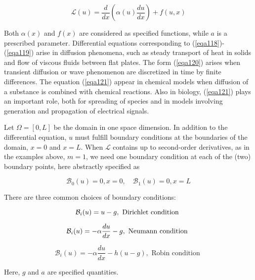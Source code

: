 \documentclass[../main.tex]{subfiles}
\begin{document}
	\begin{equation}
		\label{eqa121}
		\mathcal{L}(u)=\frac{d}{d x}\left(\alpha(u) \frac{d u}{d x}\right)+f(u, x)
	\end{equation}
	
	\noindent Both $\alpha(x)$ and $f(x)$ are considered as specified functions, while $a$ is a prescribed parameter. Differential equations corresponding to (\ref{eqa118})-(\ref{eqa119}) arise in diffusion phenomena, such as steady transport of heat in solids and flow of viscous fluids between flat plates. The form (\ref{eqa120}) arises when transient diffusion or wave phenomenon are discretized in time by finite differences. The equation (\ref{eqa121}) appear in chemical models when diffusion of a substance is combined with chemical reactions. Also in biology, (\ref{eqa121}) plays an important role, both for spreading of species and in models involving generation and propagation of electrical signals.
	
	Let $\Omega=[0, L]$ be the domain in one space dimension. In addition to the differential equation, $u$ must fulfill boundary conditions at the boundaries of the domain, $x=0$ and $x=L$. When $\mathcal{L}$ contains up to second-order derivatives, as in the examples above, $m=1$, we need one boundary condition at each of the (two) boundary points, here abstractly specified as
	
	\begin{equation}
		\label{eqa122}
		\mathcal{B}_{0}(u)=0, x=0, \quad \mathcal{B}_{1}(u)=0, x=L
	\end{equation}
	
	\noindent There are three common choices of boundary conditions:
	
	\begin{equation}
		\label{eqa123}
		\mathcal{B}_{i}(u)  =u-g,  \text { Dirichlet condition } \\
	\end{equation}

	\begin{equation}
		\label{eqa124}
		\mathcal{B}_{i}(u)  =-\alpha \frac{d u}{d x}-g,  \text { Neumann condition } \\
	\end{equation}

	\begin{equation}
		\label{eqa125}
		\mathcal{B}_{i}(u) =-\alpha \frac{d u}{d x}-h(u-g),  \text { Robin condition }
	\end{equation}	

	\noindent Here, $g$ and $a$ are specified quantities.
	
\end{document}
